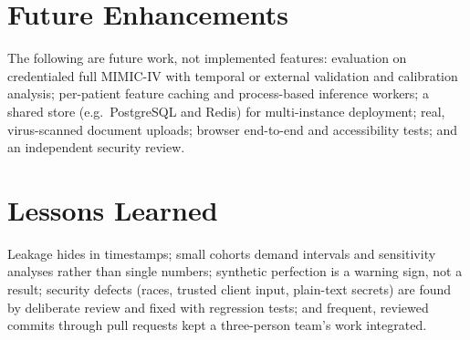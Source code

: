 \section{Future Enhancements}
The following are future work, not implemented features: evaluation on credentialed full MIMIC-IV with
temporal or external validation and calibration analysis; per-patient feature caching and process-based
inference workers; a shared store (e.g.\ PostgreSQL and Redis) for multi-instance deployment; real,
virus-scanned document uploads; browser end-to-end and accessibility tests; and an independent security
review.

\section{Lessons Learned}
Leakage hides in timestamps; small cohorts demand intervals and sensitivity analyses rather than single
numbers; synthetic perfection is a warning sign, not a result; security defects (races, trusted client
input, plain-text secrets) are found by deliberate review and fixed with regression tests; and frequent,
reviewed commits through pull requests kept a three-person team's work integrated.
